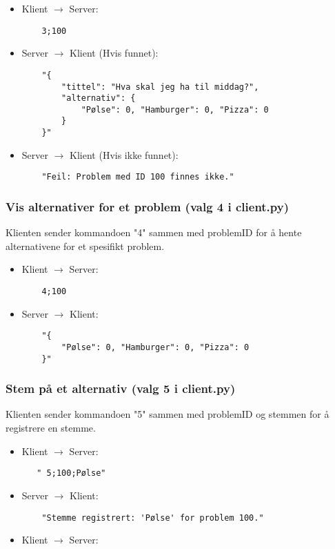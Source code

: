 \documentclass[hidelinks]{article}
\begin{document}
\begin{itemize}
    \item Klient \(\rightarrow\) Server:
    \begin{verbatim}
    3;100
    \end{verbatim}
     \item Server \(\rightarrow\) Klient (Hvis funnet):
     \begin{verbatim}
    "{
        "tittel": "Hva skal jeg ha til middag?",
        "alternativ": {
            "Pølse": 0, "Hamburger": 0, "Pizza": 0
        }
    }"
    \end{verbatim}
    \item Server \(\rightarrow\) Klient (Hvis ikke funnet):
    \begin{verbatim}
    "Feil: Problem med ID 100 finnes ikke."
    \end{verbatim}
\end{itemize}

\subsubsection{Vis alternativer for et problem (valg 4 i client.py)}
Klienten sender kommandoen "4" sammen med problemID for å hente alternativene for et spesifikt problem.

\begin{itemize}
    \item Klient \(\rightarrow\) Server:
    \begin{verbatim}
    4;100
    \end{verbatim}
    \item Server \(\rightarrow\) Klient:
    \begin{verbatim}
    "{
        "Pølse": 0, "Hamburger": 0, "Pizza": 0
    }"
    \end{verbatim}
\end{itemize}

\subsubsection{Stem på et alternativ (valg 5 i client.py)}
Klienten sender kommandoen "5" sammen med problemID og stemmen for å registrere en stemme.

\begin{itemize}
    \item Klient \(\rightarrow\) Server:
    \begin{verbatim}
   " 5;100;Pølse"
    \end{verbatim}
    \item Server \(\rightarrow\) Klient:
    \begin{verbatim}
    "Stemme registrert: 'Pølse' for problem 100."
    \end{verbatim}
    \item Klient \(\rightarrow\) Server:
\end{itemize}
\end{document}
